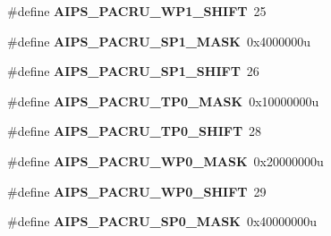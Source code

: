 \begin{DoxyCompactItemize}
\item 
\#define {\bfseries A\+I\+P\+S\+\_\+\+P\+A\+C\+R\+U\+\_\+\+W\+P1\+\_\+\+S\+H\+I\+FT}~25\hypertarget{group__AIPS__Register__Masks_gabb2111d291f1349f14107f21d4bbcafa}{}\label{group__AIPS__Register__Masks_gabb2111d291f1349f14107f21d4bbcafa}

\item 
\#define {\bfseries A\+I\+P\+S\+\_\+\+P\+A\+C\+R\+U\+\_\+\+S\+P1\+\_\+\+M\+A\+SK}~0x4000000u\hypertarget{group__AIPS__Register__Masks_gae9999a5eebb95b0c9975d799c2f81328}{}\label{group__AIPS__Register__Masks_gae9999a5eebb95b0c9975d799c2f81328}

\item 
\#define {\bfseries A\+I\+P\+S\+\_\+\+P\+A\+C\+R\+U\+\_\+\+S\+P1\+\_\+\+S\+H\+I\+FT}~26\hypertarget{group__AIPS__Register__Masks_gadcc067c6bd46dc4d40b8b4332cc9e3da}{}\label{group__AIPS__Register__Masks_gadcc067c6bd46dc4d40b8b4332cc9e3da}

\item 
\#define {\bfseries A\+I\+P\+S\+\_\+\+P\+A\+C\+R\+U\+\_\+\+T\+P0\+\_\+\+M\+A\+SK}~0x10000000u\hypertarget{group__AIPS__Register__Masks_ga0573aaae4d31e91dff47dbff9f8ddfb6}{}\label{group__AIPS__Register__Masks_ga0573aaae4d31e91dff47dbff9f8ddfb6}

\item 
\#define {\bfseries A\+I\+P\+S\+\_\+\+P\+A\+C\+R\+U\+\_\+\+T\+P0\+\_\+\+S\+H\+I\+FT}~28\hypertarget{group__AIPS__Register__Masks_ga6b2e5865ad383db51605af18319df9ee}{}\label{group__AIPS__Register__Masks_ga6b2e5865ad383db51605af18319df9ee}

\item 
\#define {\bfseries A\+I\+P\+S\+\_\+\+P\+A\+C\+R\+U\+\_\+\+W\+P0\+\_\+\+M\+A\+SK}~0x20000000u\hypertarget{group__AIPS__Register__Masks_ga3446c40a6a29e77a1e58737661820c43}{}\label{group__AIPS__Register__Masks_ga3446c40a6a29e77a1e58737661820c43}

\item 
\#define {\bfseries A\+I\+P\+S\+\_\+\+P\+A\+C\+R\+U\+\_\+\+W\+P0\+\_\+\+S\+H\+I\+FT}~29\hypertarget{group__AIPS__Register__Masks_ga0418c29f05f705a85684867c78f72c50}{}\label{group__AIPS__Register__Masks_ga0418c29f05f705a85684867c78f72c50}

\item 
\#define {\bfseries A\+I\+P\+S\+\_\+\+P\+A\+C\+R\+U\+\_\+\+S\+P0\+\_\+\+M\+A\+SK}~0x40000000u\hypertarget{group__AIPS__Register__Masks_gaaf0a5c35e265266dc456996993016f17}{}\label{group__AIPS__Register__Masks_gaaf0a5c35e265266dc456996993016f17}


\end{DoxyCompactItemize}
